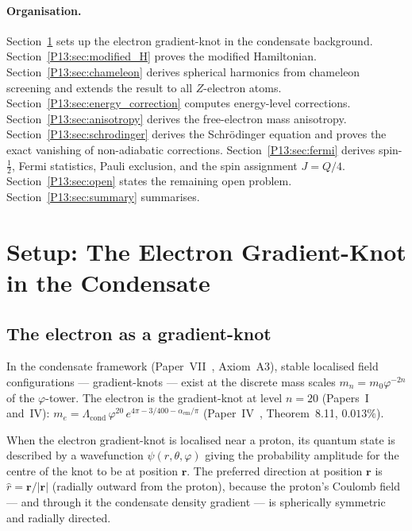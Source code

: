 \documentclass[11pt,a4paper]{article}
\theoremstyle{definition}
\theoremstyle{remark}
\newcommand{\vp}{\varphi}
\newcommand{\Lcond}{\Lambda_{\mathrm{cond}}}
\newcommand{\aem}{\alpha_{\mathrm{em}}}
\begin{document}
\paragraph{Organisation.}
Section~\ref{P13:sec:setup} sets up the electron gradient-knot in the
condensate background.
Section~\ref{P13:sec:modified_H} proves the modified Hamiltonian.
Section~\ref{P13:sec:chameleon} derives spherical harmonics from chameleon
screening and extends the result to all $Z$-electron atoms.
Section~\ref{P13:sec:energy_correction} computes energy-level corrections.
Section~\ref{P13:sec:anisotropy} derives the free-electron mass anisotropy.
Section~\ref{P13:sec:schrodinger} derives the Schr\"odinger equation and
proves the exact vanishing of non-adiabatic corrections.
Section~\ref{P13:sec:fermi} derives spin-$\tfrac{1}{2}$, Fermi statistics,
Pauli exclusion, and the spin assignment $J=Q/4$.
Section~\ref{P13:sec:open} states the remaining open problem.
Section~\ref{P13:sec:summary} summarises.

\section{Setup: The Electron Gradient-Knot in the Condensate}
\label{P13:sec:setup}

\subsection{The electron as a gradient-knot}

In the condensate framework (Paper~VII~\cite{Paper7}, Axiom~A3),
stable localised field configurations --- gradient-knots --- exist at
the discrete mass scales $m_n = m_0\vp^{-2n}$ of the $\vp$-tower.
The electron is the gradient-knot at level $n = 20$ (Papers~I and~IV):
$m_e = \Lcond\,\vp^{20}\,e^{4\pi-3/400-\aem/\pi}$
(Paper~IV~\cite{Paper4}, Theorem~8.11, $0.013\%$).

When the electron gradient-knot is localised near a proton, its
quantum state is described by a wavefunction $\psi(r,\theta,\varphi)$
giving the probability amplitude for the centre of the knot to be at
position $\mathbf{r}$.
The preferred direction at position $\mathbf{r}$ is
$\hat{r} = \mathbf{r}/|\mathbf{r}|$ (radially outward from the proton),
because the proton's Coulomb field --- and through it the condensate
density gradient --- is spherically symmetric and radially directed.
\end{document}
